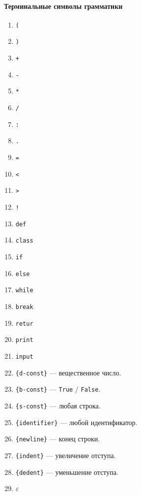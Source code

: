 \documentclass[a4paper,10pt,notitlepage,pdftex]{scrreprt}
\begin{document}
        \paragraph{Терминальные символы грамматики}
        \label{para:term}
        \begin{multicols}{3}
            \begin{enumerate}
                \item \verb'('
                \item \verb')'
                \item \verb'+'
                \item \verb'-'
                \item \verb'*'
                \item \verb'/'
                \item \verb':'
                \item \verb'.'
                \item \verb'='
                \item \verb'<'
                \item \verb'>'
                \item \verb'!'
                \item \verb'def'
                \item \verb'class'
                \item \verb'if'
                \item \verb'else'
                \item \verb'while'
                \item \verb'break'
                \item \verb'retur'
                \item \verb'print'
                \item \verb'input'
                \item \verb'{d-const}' --- вещественное число.
                \item \verb'{b-const}' --- \verb'True' / \verb'False'.
                \item \verb'{s-const}' --- любая строка.
                \item \verb'{identifier}' --- любой идентификатор.
                \item \verb'{newline}' --- конец строки.
                \item \verb'{indent}' --- увеличение отступа.
                \item \verb'{dedent}' --- уменьшение отступа.
                \item $\varepsilon$
            \end{enumerate}
        \end{multicols}
\end{document}
